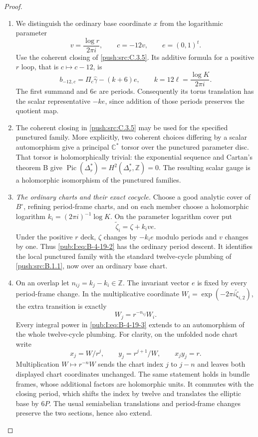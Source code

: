 \begin{proof}
\begin{enumerate}[label=\arabic*.,leftmargin=*]
\item We distinguish the ordinary base coordinate $x$ from
the logarithmic parameter
\[
 v=\frac{\log r}{2\pi i},\qquad c=-12v,
 \qquad e=(0,1)^t.
\]
Use the coherent closing of \ref{push:src:C.3.5}. Its additive formula
for a positive $r$ loop, that is $c\mapsto c-12$, is
\begin{equation}
 b_{-12,c}=\Pi_c\widehat\gamma-(k+6)e,
 \qquad k=12\ell=\frac{\log K}{2\pi i}.
\label{pub:I:eq:B-4-19-1}
\end{equation}
The first summand and $6e$ are periods.
Consequently its torus translation has the scalar
representative $-ke$, since addition of those periods
preserves the quotient map.

\item The coherent closing in \ref{push:src:C.3.5} may be used for the
specified punctured family. More explicitly, two
coherent choices differing by a scalar automorphism
give a principal $\mathbb C^*$ torsor over the punctured
parameter disc. That torsor is holomorphically trivial:
the exponential sequence and Cartan's theorem B give
$\operatorname{Pic}(\Delta_r^*)=H^2(\Delta_r^*,\mathbb Z)=0$.
The resulting scalar gauge is a holomorphic
isomorphism of the punctured families.

\item \emph{The ordinary charts and their exact cocycle.}
Choose a good analytic cover of $B^\circ$, refining
period-frame charts, and on each member choose a
holomorphic logarithm $k_i=(2\pi i)^{-1}\log K$.
On the parameter logarithm cover put
\begin{equation}
 \widetilde\zeta_i=\zeta+k_i v e.
\label{pub:I:eq:B-4-19-2}
\end{equation}
Under the positive $r$ deck, $\zeta$ changes by
$-k_i e$ modulo periods and $v$ changes by one.
Thus \eqref{pub:I:eq:B-4-19-2} has the ordinary period descent.
It identifies the local punctured family
with the standard twelve-cycle plumbing of \ref{push:src:B.1.1},
now over an ordinary base chart.

\item On an overlap let $n_{ij}=k_j-k_i\in\mathbb Z$.
The invariant vector $e$ is fixed by every period-frame
change. In the multiplicative coordinate
$W_i=\exp(-2\pi i\widetilde\zeta_{i,2})$, the extra
transition is exactly
\begin{equation}
 W_j=r^{-n_{ij}}W_i.
\label{pub:I:eq:B-4-19-3}
\end{equation}
Every integral power in \eqref{pub:I:eq:B-4-19-3} extends to an
automorphism of the whole twelve-cycle plumbing.
For clarity, on the unfolded node chart write
\[
 x_j=W/r^j,\qquad y_j=r^{j+1}/W,
 \qquad x_jy_j=r.
\]
Multiplication $W\mapsto r^{-n}W$ sends the chart
index $j$ to $j-n$ and leaves both displayed chart
coordinates unchanged. The same statement holds
in bundle frames, whose additional factors are
holomorphic units. It commutes with the closing
period, which shifts the index by twelve and
translates the elliptic base by $6P$.
The usual semiabelian translations and period-frame
changes preserve the two sections, hence also extend.


\end{enumerate}
\end{proof}
